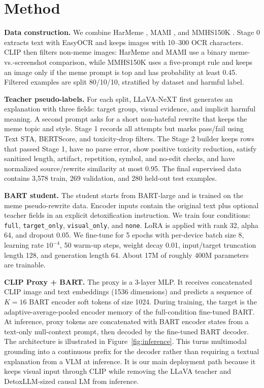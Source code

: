 \documentclass{article}
\newcommand{\sta}{\textsc{STA}}
\begin{document}
\section{Method}
\label{sec:method}

\textbf{Data construction.} We combine HarMeme \cite{pramanick2021harmeme},
MAMI \cite{fersini2022mami}, and MMHS150K \cite{gomez2020multimodal}. Stage 0
extracts text with EasyOCR and keeps images with 10--300 OCR characters. CLIP
then filters non-meme images: HarMeme and MAMI use a binary meme-vs.-screenshot
comparison, while MMHS150K uses a five-prompt rule and keeps an image only if
the meme prompt is top and has probability at least 0.45. Filtered examples are
split 80/10/10, stratified by dataset and harmful label.

\textbf{Teacher pseudo-labels.} For each split, LLaVA-NeXT first generates an explanation with three fields: target group, visual evidence, and implicit
harmful meaning. A second prompt asks for a short non-hateful rewrite that keeps
the meme topic and style. Stage 1 records all attempts but marks pass/fail using
Text \sta{}, BERTScore, and toxicity-drop filters.
The Stage 2 builder keeps rows that passed Stage 1, have no parse error, show
positive toxicity reduction, satisfy sanitized length, artifact, repetition,
symbol, and no-edit checks, and have normalized source/rewrite similarity at
most 0.95. The final supervised data contains
3,578 train, 269 validation, and 280 held-out test examples.

\textbf{BART student.} The student starts from BART-large and is trained 
on the meme pseudo-rewrite data.
Encoder inputs contain the original text plus optional teacher fields in an
explicit detoxification instruction. We train four conditions: \texttt{full},
\texttt{target\_only}, \texttt{visual\_only}, and \texttt{none}. LoRA is applied with rank 32, alpha 64, and dropout 0.05.
We fine-tune for 5 epochs with per-device batch size 8, learning rate
$10^{-4}$, 50 warm-up steps, weight decay 0.01, input/target truncation length
128, and generation length 64. About 17M of roughly 400M parameters are trainable.

\textbf{CLIP Proxy + BART.} The proxy is a 3-layer MLP. It receives
concatenated CLIP image and text embeddings (1536 dimensions) and predicts a
sequence of $K=16$ BART encoder soft tokens of size 1024. During training, the
target is the adaptive-average-pooled encoder memory of the full-condition
fine-tuned BART. At inference, proxy tokens are concatenated with BART encoder
states from a text-only null-context prompt, then decoded by the fine-tuned BART
decoder. The architecture is illustrated in Figure~\ref{fig:inference}.
This
turns multimodal grounding into a continuous prefix for the decoder rather than
requiring a textual explanation from a VLM at inference. It is our main
deployment path because it keeps visual input through CLIP while removing the
LLaVA teacher and DetoxLLM-sized causal LM from inference.
\end{document}
